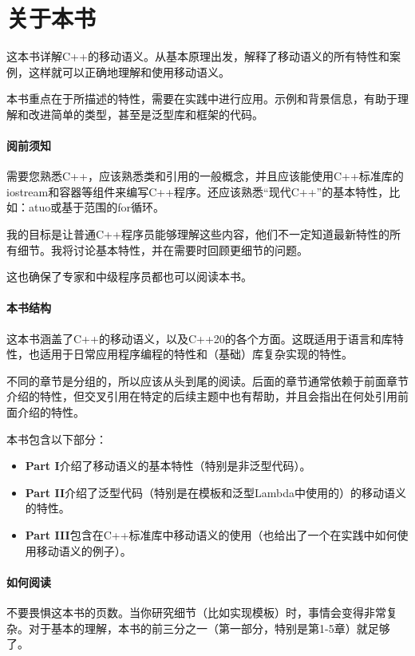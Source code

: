 \chapter{关于本书}

这本书详解C++的移动语义。从基本原理出发，解释了移动语义的所有特性和案例，这样就可以正确地理解和使用移动语义。

本书重点在于所描述的特性，需要在实践中进行应用。示例和背景信息，有助于理解和改进简单的类型，甚至是泛型库和框架的代码。

\subsubsection{阅前须知}

需要您熟悉C++，应该熟悉类和引用的一般概念，并且应该能使用C++标准库的iostream和容器等组件来编写C++程序。还应该熟悉“现代C++”的基本特性，比如：atuo或基于范围的for循环。

我的目标是让普通C++程序员能够理解这些内容，他们不一定知道最新特性的所有细节。我将讨论基本特性，并在需要时回顾更细节的问题。

这也确保了专家和中级程序员都也可以阅读本书。


\subsubsection{本书结构}

这本书涵盖了C++的移动语义，以及C++20的各个方面。这既适用于语言和库特性，也适用于日常应用程序编程的特性和（基础）库复杂实现的特性。

不同的章节是分组的，所以应该从头到尾的阅读。后面的章节通常依赖于前面章节介绍的特性，但交叉引用在特定的后续主题中也有帮助，并且会指出在何处引用前面介绍的特性。

本书包含以下部分：
\begin{itemize}
	\item \textbf{Part I}介绍了移动语义的基本特性（特别是非泛型代码）。
	\item \textbf{Part II}介绍了泛型代码（特别是在模板和泛型Lambda中使用的）的移动语义的特性。
	\item \textbf{Part III}包含在C++标准库中移动语义的使用（也给出了一个在实践中如何使用移动语义的例子）。
\end{itemize}


\subsubsection{如何阅读}

不要畏惧这本书的页数。当你研究细节（比如实现模板）时，事情会变得非常复杂。对于基本的理解，本书的前三分之一（第一部分，特别是第1-5章）就足够了。

